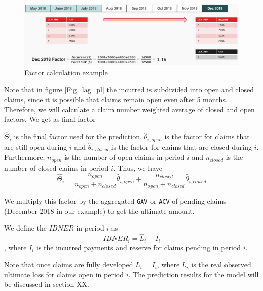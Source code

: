	\begin{figure}[H]
		\begin{center}
			\includegraphics[scale=0.4]{Graphiques/factor_example} 
			\renewcommand{\figurename}{Figure}
			\caption{Factor calculation example}\label{Fig_factor_example}
		\end{center}
	\end{figure}
	Note that in figure \ref{Fig_lag_pl} the incurred is subdivided into open and closed claims, since it is possible that claims remain open even after 5 months. Therefore, we will calculate a claim number weighted average of closed and open factors. We get as final factor
	\begin{Definition}\label{Def_final_factor}
		$\hat{\Theta}_i$ is the final factor used for the prediction. $\hat{\theta}_{i,open}$ is the factor for claims that are still open during $i$ and  $\hat{\theta}_{i,closed}$ is the factor for claims that are closed during $i$. Furthermore, $n_{open}$ is the number of open claims in period $i$ and $n_{closed}$ is the number of closed claims in period $i$. Thus, we have
		$$\hat{\Theta}_i = \frac{n_{open}}{n_{open} + n_{closed}} \hat{\theta}_{i,open} + \frac{n_{closed}}{n_{open} + n_{closed}}  \hat{\theta}_{i,closed}$$ 
	\end{Definition}
	
	We multiply this factor by the aggregated \texttt{GAV} or \texttt{ACV} of pending claims (December 2018 in our example) to get the ultimate amount.
	
	\begin{Definition}
		We define the $IBNER$ in period $i$ as
		$$IBNER_i = \hat{L}_i - I_i$$
		, where $I_i$ is the incurred payments and reserve for claims pending in period $i$.
	\end{Definition}
	Note that once claims are fully developed $L_i = I_i$, where $L_i$ is the real observed ultimate loss for claims open in period $i$. 
	The prediction results for the model will be discussed in section XX.
	
